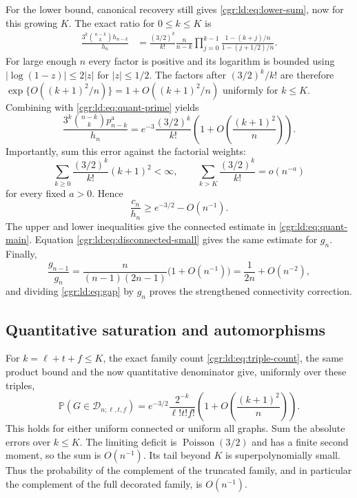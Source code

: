 \documentclass[11pt,letterpaper]{article}
\numberwithin{equation}{section}
\theoremstyle{definition}\newtheorem{definition}[theorem]{Definition}
\theoremstyle{remark}\newtheorem{remark}[theorem]{Remark}
\newcommand{\PP}{\mathbb P}
\DeclareMathOperator{\Poi}{Poisson}
\begin{document}
For the lower bound, canonical recovery still gives
\eqref{cgr:ld:eq:lower-sum}, now for this growing $K$. The exact ratio
for $0\le k\le K$ is
\begin{align}
 \frac{3^k\binom{n-k}{k}h_{n-k}}{h_n}
 &=\frac{(3/2)^k}{k!}\frac n{n-k}
   \prod_{j=0}^{k-1}
       \frac{1-(k+j)/n}{1-(j+1/2)/n}.\label{cgr:ld:eq:uniform-product}
\end{align}
For large enough $n$ every factor is positive and its logarithm
is bounded using $|\log(1-z)|\le2|z|$ for $|z|\le1/2$.
The factors after $(3/2)^k/k!$ are therefore
$\exp\{O((k+1)^2/n)\}=1+O((k+1)^2/n)$ uniformly for
$k\le K$. Combining with \eqref{cgr:ld:eq:quant-prime} yields
\begin{equation}\label{cgr:ld:eq:uniform-decorate}
 \frac{3^k\binom{n-k}{k}p_{n-k}^{\mathrm a}}{h_n}
 =e^{-3}\frac{(3/2)^k}{k!}
       \left(1+O\left(\frac{(k+1)^2}{n}\right)\right).
\end{equation}
Importantly, sum this error against the factorial weights:
\[
 \sum_{k\ge0}\frac{(3/2)^k}{k!}(k+1)^2<\infty,\qquad
 \sum_{k>K}\frac{(3/2)^k}{k!}=o(n^{-a})
\]
for every fixed $a>0$. Hence
\begin{equation}\label{cgr:ld:eq:quant-lower}
 \frac{c_n}{h_n}\ge e^{-3/2}-O(n^{-1}).
\end{equation}
The upper and lower inequalities give the connected estimate
in \eqref{cgr:ld:eq:quant-main}. Equation \eqref{cgr:ld:eq:disconnected-small}
gives the same estimate for $g_n$. Finally,
\[
 \frac{g_{n-1}}{g_n}
 =\frac n{(n-1)(2n-1)}\bigl(1+O(n^{-1})\bigr)
 =\frac1{2n}+O(n^{-2}),
\]
and dividing \eqref{cgr:ld:eq:gap} by $g_n$ proves the strengthened
connectivity correction.

\subsection*{Quantitative saturation and automorphisms}
For $k=\ell+t+f\le K$, the exact family count
\eqref{cgr:ld:eq:triple-count}, the same product bound and the now
quantitative denominator give, uniformly over these triples,
\begin{equation}\label{cgr:ld:eq:quant-triples}
 \PP(G\in\mathcal D_{n;\ell,t,f})
 =e^{-3/2}\frac{2^{-k}}{\ell!t!f!}
       \left(1+O\left(\frac{(k+1)^2}{n}\right)\right).
\end{equation}
This holds for either uniform connected or uniform all graphs.
Sum the absolute errors over $k\le K$. The limiting deficit is
$\Poi(3/2)$ and has a finite second moment, so the sum is
$O(n^{-1})$. Its tail beyond $K$ is superpolynomially small.
Thus the probability of the complement of the truncated family,
and in particular the complement of the full decorated family,
is $O(n^{-1})$.
\end{document}
